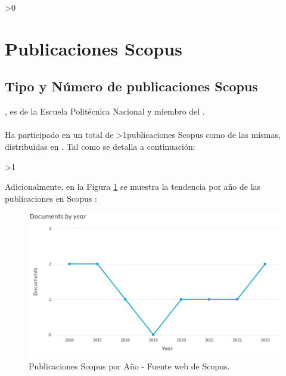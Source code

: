 \documentclass[fleqn,10pt]{wlscirep}
\begin{document}
\ifnum\numpublicacionesscopus>0{
\section*{Publicaciones Scopus}
\subsection*{Tipo y Número de publicaciones Scopus \ifnum{}\fi \docente}
\vspace{1mm}
\ifnum{}\fi \docente, es \cargo  de la Escuela Politécnica Nacional y miembro del \departamento. \\\\Ha  participado  en  un  total  de \numpublicacionesscopus \ifnum\numpublicacionesscopus>1{publicaciones Scopus como \ifnum{}\fi de las mismas, distribuidas en \distribucionArticulosScopus}\fi. Tal como se detalla a continuación:
\begin{enumerate}
\detalleScopus
\end{enumerate}
\ifnum{}\fi

\vspace{5mm}

\ifnum\numpublicacionesscopus>1{ \noindent Adicionalmente, en la Figura \ref{fig:gr1} se muestra la tendencia por año de las publicaciones en Scopus \ifnum{}\fi \docente :

\begin{figure}[ht]
\centering
\includegraphics[width=.95 \linewidth]{gr1}%
\caption{\small Publicaciones Scopus por Año - Fuente web de Scopus.}
\label{fig:gr1}
\end{figure}
}\fi
\vspace{1mm}
}
\end{document}
